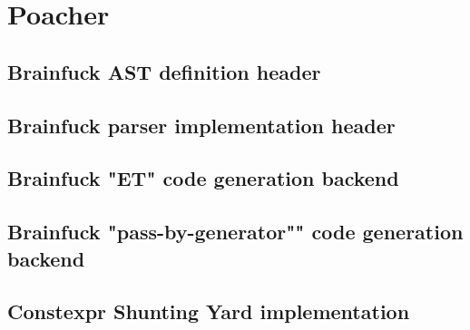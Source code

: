 \documentclass[../main]{subfiles}
\begin{document}
\section{
  Poacher
}

\subsection{
  Brainfuck AST definition header
}
\label{app:bf-ast}



\clearpage{} %

\subsection{
  Brainfuck parser implementation header
}
\label{app:bf-parser}



\clearpage{} %

\subsection{
  Brainfuck "ET" code generation backend
}
\label{app:bf-et-backend}



\clearpage{} %

\subsection{
  Brainfuck "pass-by-generator"" code generation backend
}
\label{app:bf-pbg-backend}



\clearpage{} %

\subsection{
  Constexpr Shunting Yard implementation
}
\label{app:shunting-yard-impl}


\end{document}
